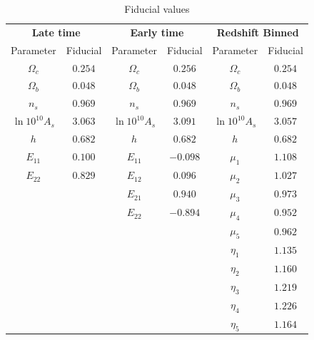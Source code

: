 \begin{table}[htbp]
\centering{}
\begin{tabular}{|cc|cc|cc|}
\hline 
\multicolumn{2}{|c|}{\textbf{Late time}} &
\multicolumn{2}{c|}{\textbf{Early time}} &
\multicolumn{2}{c|}{\Tstrut \textbf{Redshift Binned}}\tabularnewline
\multicolumn{1}{|c}{Parameter } & \multicolumn{1}{c|}{Fiducial } &
\multicolumn{1}{c}{Parameter } & \multicolumn{1}{c|}{Fiducial } &
\multicolumn{1}{c}{Parameter } & \multicolumn{1}{c|}{Fiducial }\tabularnewline
\hline 
$\Omega_{c}$  & \multicolumn{1}{c|}{$0.254$ } & $\Omega_{c}$  &
\multicolumn{1}{c|}{$0.256$} & $\Omega_{c}$  & $0.254$ \tabularnewline
$\Omega_{b}$  & \multicolumn{1}{c|}{$0.048$ } & $\Omega_{b}$  &
\multicolumn{1}{c|}{$0.048$} & $\Omega_{b}$  & $0.048$ \tabularnewline
$n_{s}$  & \multicolumn{1}{c|}{$0.969$ } & $n_{s}$  &
\multicolumn{1}{c|}{$0.969$} & $n_{s}$  & $0.969$ \tabularnewline
$\ln10^{10}A_{s}$  & \multicolumn{1}{c|}{$3.063$ } & $\ln10^{10}A_{s}$  &
\multicolumn{1}{c|}{$3.091$} & $\ln10^{10}A_{s}$  & $3.057$ \tabularnewline
$h$  & \multicolumn{1}{c|}{$0.682$ } & $h$  & \multicolumn{1}{c|}{$0.682$} &
$h$  & $0.682$ \tabularnewline
$E_{11}$  & \multicolumn{1}{c|}{$0.100$ } & $E_{11}$  &
\multicolumn{1}{c|}{$-0.098$} & $\mu_{1}$  & $1.108$\tabularnewline
$E_{22}$  & \multicolumn{1}{c|}{$0.829$ } & $E_{12}$  &
\multicolumn{1}{c|}{$0.096$} & $\mu_{2}$  & $1.027$\tabularnewline
\cline{1-2} 
\multicolumn{1}{c}{} & \multicolumn{1}{c|}{} & $E_{21}$  &
\multicolumn{1}{c|}{$0.940$} & $\mu_{3}$  & $0.973$\tabularnewline
\multicolumn{1}{c}{} & \multicolumn{1}{c|}{} & $E_{22}$  &
\multicolumn{1}{c|}{$-0.894$} & $\mu_{4}$  & $0.952$\tabularnewline
\cline{3-4} 
\multicolumn{1}{c}{} & \multicolumn{1}{c}{} & \multicolumn{1}{c}{} &
\multicolumn{1}{c|}{} & $\mu_{5}$  & $0.962$\tabularnewline
\multicolumn{1}{c}{} & \multicolumn{1}{c}{} & \multicolumn{1}{c}{} &
\multicolumn{1}{c|}{} & $\eta_{1}$  & $1.135$\tabularnewline
\multicolumn{1}{c}{} & \multicolumn{1}{c}{} & \multicolumn{1}{c}{} &
\multicolumn{1}{c|}{} & $\eta_{2}$  & $1.160$\tabularnewline
\multicolumn{1}{c}{} & \multicolumn{1}{c}{} & \multicolumn{1}{c}{} &
\multicolumn{1}{c|}{} & $\eta_{3}$  & $1.219$\tabularnewline
\multicolumn{1}{c}{} & \multicolumn{1}{c}{} & \multicolumn{1}{c}{} &
\multicolumn{1}{c|}{} & $\eta_{4}$  & $1.226$\tabularnewline
\multicolumn{1}{c}{} & \multicolumn{1}{c}{} & \multicolumn{1}{c}{} &
\multicolumn{1}{c|}{} & $\eta_{5}$  & $1.164$\tabularnewline
\cline{5-6} 
\end{tabular}\caption[Modified Gravity fiducials in three parametrizations]{\label{tab:fiducial-MG-AllCases} Fiducial values
}
\end{table}
